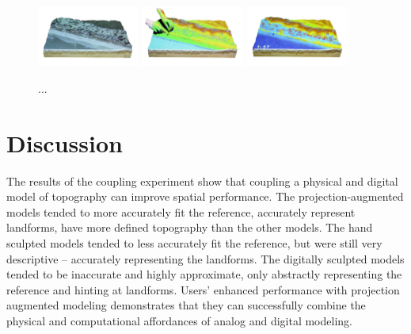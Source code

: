 \documentclass[prodmode,acmtochi]{acmsmall} %
\begin{document}
\begin{figure}[ht!]
\begin{center}
		\includegraphics[width=0.3\textwidth]{images/tl_coastal_1s.png}
		\includegraphics[width=0.3\textwidth]{images/tl_coastal_3s.png}
		\includegraphics[width=0.3\textwidth]{images/tl_coastal_4s.png}
	\caption{...}
	\label{fig:coastal_game}
\end{center}
\end{figure}

\section{Discussion}



The results of the coupling experiment show that 
coupling a physical and digital model of topography 
can improve spatial performance. 
%
The projection-augmented models tended
to more accurately fit the reference, 
accurately represent landforms, 
have more defined topography
than the other models. 
%
The hand sculpted models tended
to less accurately fit the reference, but
were still very descriptive 
-- accurately representing the landforms. 
%
The digitally sculpted models tended
to be inaccurate and highly approximate,
only abstractly representing the reference
and hinting at landforms. 
%
Users' enhanced performance with projection augmented modeling 
demonstrates that they can successfully 
combine the physical and computational affordances 
of analog and digital modeling. 
\end{document}

